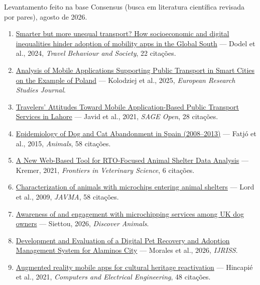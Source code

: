 \documentclass[11pt,a4paper]{article}
\begin{document}
{\small
Levantamento feito na base Consensus (busca em literatura científica revisada por pares), agosto de 2026.

\begin{enumerate}
\item \href{https://consensus.app/papers/details/fc75220c52a95957a4dec4a2aa6f8901/}{Smarter but more unequal transport? How socioeconomic and digital inequalities hinder adoption of mobility apps in the Global South} --- Dodel et al., 2024, \textit{Travel Behaviour and Society}, 22 citações.
\item \href{https://consensus.app/papers/details/eb464c9e48945f00a7f8196af006dcc3/}{Analysis of Mobile Applications Supporting Public Transport in Smart Cities on the Example of Poland} --- Kolodziej et al., 2025, \textit{European Research Studies Journal}.
\item \href{https://consensus.app/papers/details/c3732851551955b693e3ee79154b597c/}{Travelers' Attitudes Toward Mobile Application-Based Public Transport Services in Lahore} --- Javid et al., 2021, \textit{SAGE Open}, 28 citações.
\item \href{https://consensus.app/papers/details/9df5e3297a9b57feb281f7123b5ab1d4/}{Epidemiology of Dog and Cat Abandonment in Spain (2008--2013)} --- Fatjó et al., 2015, \textit{Animals}, 58 citações.
\item \href{https://consensus.app/papers/details/c21ff3ff3de454c197b78a6de373f05e/}{A New Web-Based Tool for RTO-Focused Animal Shelter Data Analysis} --- Kremer, 2021, \textit{Frontiers in Veterinary Science}, 6 citações.
\item \href{https://consensus.app/papers/details/3196b2e85ce05a5fa3f71092ed09de2e/}{Characterization of animals with microchips entering animal shelters} --- Lord et al., 2009, \textit{JAVMA}, 58 citações.
\item \href{https://consensus.app/papers/details/222a5dfd4803519ba57e63637534c6a9/}{Awareness of and engagement with microchipping services among UK dog owners} --- Siettou, 2026, \textit{Discover Animals}.
\item \href{https://consensus.app/papers/details/4445082e39ec52a58cd14679b1191134/}{Development and Evaluation of a Digital Pet Recovery and Adoption Management System for Alaminos City} --- Morales et al., 2026, \textit{IJRISS}.
\item \href{https://consensus.app/papers/details/f8af04c8a17b5dfca393a7dfe326fb20/}{Augmented reality mobile apps for cultural heritage reactivation} --- Hincapié et al., 2021, \textit{Computers and Electrical Engineering}, 48 citações.

\end{enumerate}}
\end{document}
